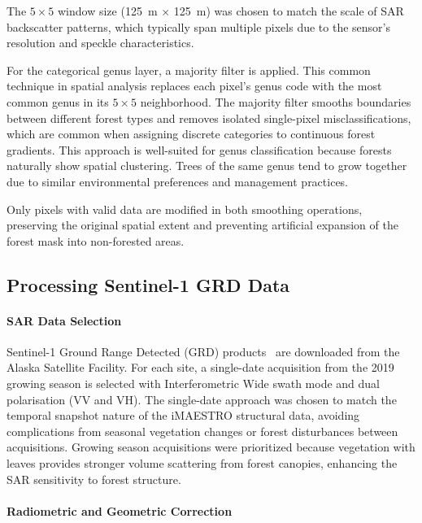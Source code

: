 The $5\times 5$ window size (\SI{125}{\meter} $\times$ \SI{125}{\meter}) was chosen to match the scale of SAR backscatter patterns, which typically span multiple pixels due to the sensor's resolution and speckle characteristics.

For the categorical genus layer, a majority filter is applied. This common technique in spatial analysis replaces each pixel's genus code with the most common genus in its $5\times 5$ neighborhood. The majority filter smooths boundaries between different forest types and removes isolated single-pixel misclassifications, which are common when assigning discrete categories to continuous forest gradients. This approach is well-suited for genus classification because forests naturally show spatial clustering. Trees of the same genus tend to grow together due to similar environmental preferences and management practices.

Only pixels with valid data are modified in both smoothing operations, preserving the original spatial extent and preventing artificial expansion of the forest mask into non-forested areas.

\subsection{Processing Sentinel-1 GRD Data}

\paragraph{SAR Data Selection}

Sentinel-1 Ground Range Detected (GRD) products~\cite{torres_gmes_2012} are downloaded from the Alaska Satellite Facility. For each site, a single-date acquisition from the 2019 growing season is selected with Interferometric Wide swath mode and dual polarisation (VV and VH). The single-date approach was chosen to match the temporal snapshot nature of the iMAESTRO structural data, avoiding complications from seasonal vegetation changes or forest disturbances between acquisitions. Growing season acquisitions were prioritized because vegetation with leaves provides stronger volume scattering from forest canopies, enhancing the SAR sensitivity to forest structure.

\paragraph{Radiometric and Geometric Correction}

